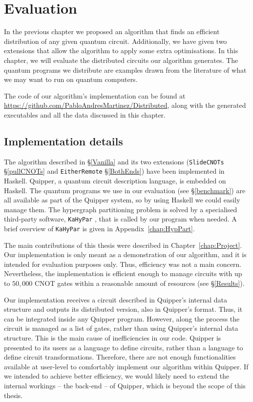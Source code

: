 \chapter{Evaluation}
\label{chap:Results}

In the previous chapter we proposed an algorithm that finds an efficient distribution of any given quantum circuit. Additionally, we have given two extensions that allow the algorithm to apply some extra optimisations. In this chapter, we will evaluate the distributed circuits our algorithm generates. The quantum programs we distribute are examples drawn from the literature of what we may want to run on quantum computers.

The code of our algorithm's implementation can be found at {\small \url{https://github.com/PabloAndresMartinez/Distributed}}, along with the generated executables and all the data discussed in this chapter. 


\section{Implementation details}
\label{implementation}

The algorithm described in \S\ref{Vanilla} and its two extensions (\texttt{SlideCNOTs} \S\ref{pullCNOTs} and \texttt{EitherRemote} \S\ref{BothEnds}) have been implemented in Haskell. Quipper, a quantum circuit description language, is embedded on Haskell. The quantum programs we use in our evaluation (see \S\ref{benchmark}) are all available as part of the Quipper system, so by using Haskell we could easily manage them. The hypergraph partitioning problem is solved by a specialised third-party software, \texttt{KaHyPar} \citep{KaHyPar}, that is called by our program when needed. A brief overview of \texttt{KaHyPar} is given in Appendix~\ref{chap:HypPart}. 

The main contributions of this thesis were described in Chapter~\ref{chap:Project}. Our implementation is only meant as a demonstration of our algorithm, and it is intended for evaluation purposes only. Thus, efficiency was not a main concern. Nevertheless, the implementation is efficient enough to manage circuits with up to \(50,000\) CNOT gates within a reasonable amount of resources (see \S\ref{Results}).

Our implementation receives a circuit described in Quipper's internal data structure and outputs its distributed version, also in Quipper's format. Thus, it can be integrated inside any Quipper program. However, along the process the circuit is managed as a list of gates, rather than using Quipper's internal data structure. This is the main cause of inefficiencies in our code. Quipper is presented to its users as a language to define circuits, rather than a language to define circuit transformations. Therefore, there are not enough functionalities available at user-level to comfortably implement our algorithm within Quipper. If we intended to achieve better efficiency, we would likely need to extend the internal workings -- the back-end -- of Quipper, which is beyond the scope of this thesis.

